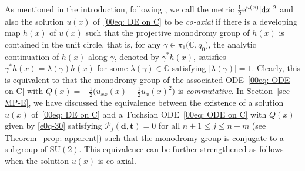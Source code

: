 \documentclass[10pt,a4paper]{amsart}
\numberwithin{equation}{section}
\def\C{\mathbb C}
\def\bt{\boldsymbol t}
\begin{document}
As mentioned in the introduction, following \cite{Mondello-Panov}, we
call the metric $\frac12{\rm e}^{u(x)}|{\rm d}x|^2$ and also the solution $u(x)$
of~\eqref{00eq: DE on C} to be \emph{co-axial} if there is a
developing map $h(x)$ of $u(x)$ such that the projective monodromy
group of $h(x)$ is contained in the unit circle, that is, for any
$\gamma\in \pi_1\bigl(\dot{\C}, q_0\bigr)$, the analytic continuation of $h(x)$
along $\gamma$, denoted by $\gamma^*h(x)$, satisfies
$\gamma^*h(x)=\lambda(\gamma)h(x)$ for some
$\lambda(\gamma)\in\mathbb{C}$ satisfying
$|\lambda(\gamma)|=1$. Clearly, this is equivalent to that the
monodromy group of the associated ODE~\eqref{00eq: ODE on C} with
$Q(x)=-\frac12\bigl(u_{xx}(x)-\frac12 u_x(x)^2\bigr)$ is \emph{commutative}. In
Section~\ref{sec-MP-E}, we have discussed the equivalence between the
existence of a solution $u(x)$ of~\eqref{00eq: DE on C}
and a~Fuchsian ODE~\eqref{00eq: ODE on C} with $Q(x)$ given by
\eqref{e0q-30} satisfying $\mathcal{P}_j(\boldsymbol{d},\bt)=0$ for
all $n+1\leq j\leq n+m$ (see Theorem~\ref{prop: apparent}) such that
the monodromy group is conjugate to a subgroup of
$\mathrm{SU}(2)$. This equivalence can be further strengthened as
follows when the solution $u(x)$ is co-axial.
\end{document}
